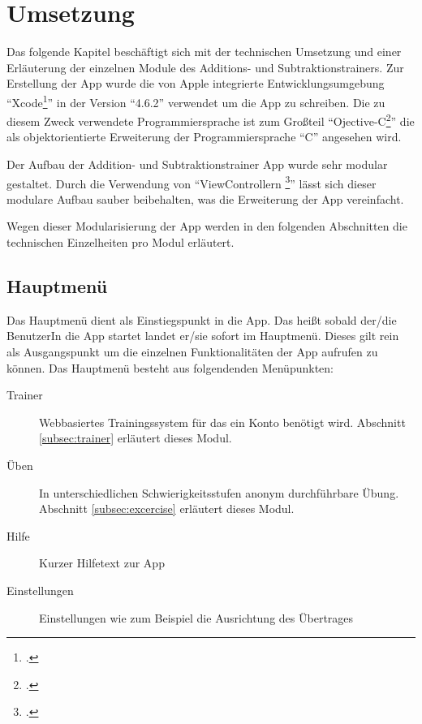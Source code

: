 
\chapter{Umsetzung}
\label{chap:impl}

Das folgende Kapitel beschäftigt sich mit der technischen Umsetzung und einer Erläuterung der einzelnen
Module des Additions- und Subtraktionstrainers. Zur Erstellung der App wurde die von Apple integrierte Entwicklungsumgebung 
\enquote{Xcode\footcite{http://developer.apple.com/xcode/ [Zugriff am 24.10.2013]}} in der Version \enquote{4.6.2} verwendet um die App zu schreiben.
Die zu diesem Zweck verwendete Programmiersprache ist zum Großteil 
\enquote{Ojective-C\footcite{http://www.gnu.org/software/gnustep/resources/documentation/Developer/Base/ProgrammingManual/manual_toc.html [Zugriff am 24.10.2013]}} die als
objektorientierte Erweiterung der Programmiersprache \enquote{C} angesehen wird.

Der Aufbau der Addition- und Subtraktionstrainer App wurde sehr modular gestaltet. Durch die Verwendung 
von \enquote{ViewControllern \footcite{http://developer.apple.com/library/ios/documentation/uikit/reference/UIViewController_Class/ [Zugriff am 24.10.2013]}}
lässt sich dieser modulare Aufbau sauber beibehalten, was die Erweiterung der App vereinfacht.

Wegen dieser Modularisierung der App werden in den folgenden Abschnitten die technischen Einzelheiten pro Modul erläutert.
\section{Hauptmenü}
Das Hauptmenü dient als Einstiegspunkt in die App. Das heißt sobald der/die BenutzerIn die App startet
landet er/sie sofort im Hauptmenü. Dieses gilt rein als Ausgangspunkt um die einzelnen Funktionalitäten
der App aufrufen zu können. Das Hauptmenü besteht aus folgendenden Menüpunkten:

\begin{description}
	\item[Trainer] Webbasiertes Trainingssystem für das ein Konto benötigt wird. Abschnitt \ref{subsec:trainer} erläutert dieses Modul. 
	\item[Üben] In unterschiedlichen Schwierigkeitsstufen anonym durchführbare Übung. Abschnitt \ref{subsec:excercise} erläutert dieses Modul.
	\item[Hilfe] Kurzer Hilfetext zur App
	\item[Einstellungen] Einstellungen wie zum Beispiel die Ausrichtung des Übertrages	
\end{description}

